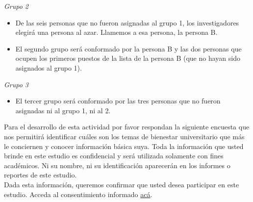 \textit{Grupo 2}
\begin{itemize}
    \item De las seis personas que no fueron asignadas al grupo 1, los investigadores elegirá una persona al azar. Llamemos a esa persona, la persona B.
    \item El segundo grupo será conformado por la persona B y las dos personas que ocupen los primeros puestos de la lista de la persona B (que no hayan sido asignados al grupo 1).
\end{itemize}
\textit{Grupo 3}
\begin{itemize}
    \item El tercer grupo será conformado por las tres personas que no fueron asignadas ni al grupo 1, ni al 2.
\end{itemize}
Para el desarrollo de esta actividad por favor respondan la siguiente encuesta que nos permitirá identificar cuáles son los temas de bienestar universitario que más le conciernen y conocer información básica suya.
Toda la información que usted brinde en este estudio es confidencial y será utilizada solamente con fines académicos. 
Ni su nombre, ni su identificación aparecerán en los informes o reportes de este estudio.\\
Dada esta información, queremos confirmar que usted desea participar en este estudio. Acceda al consentimiento informado 
\href{https://www.dropbox.com/s/2l9pwtj3sp1vbax/Consentimiento\%20Informado.pdf?dl=0}{acá}.\\

\pagebreak

